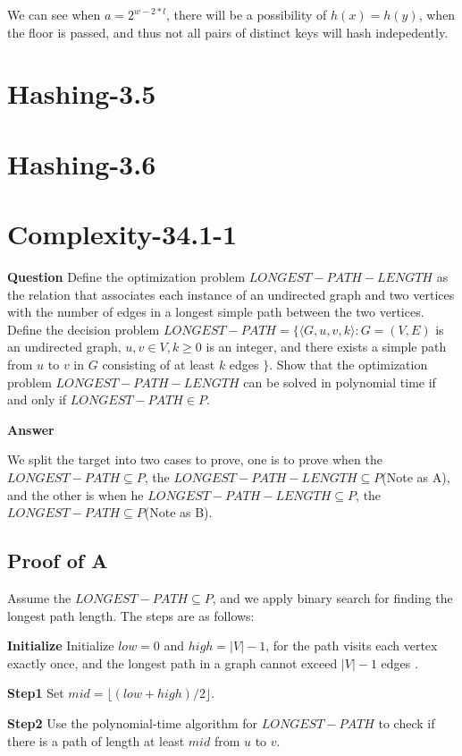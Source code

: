 \documentclass[12pt]{article}
\begin{document}
We can see when $a=2^{w-2*l}$, there will be a possibility of $h(x) = h(y)$, when the floor is passed, and thus not all pairs of distinct keys will hash indepedently.




\section{Hashing-3.5}

\section{Hashing-3.6}

\section{Complexity-34.1-1}
\textbf{Question}
Define the optimization problem $LONGEST-PATH-LENGTH$ as the relation that associates each instance of an undirected graph and two vertices with the number of edges in a longest simple path between the two vertices. Define the decision problem $LONGEST-PATH= \{\langle G, u, v, k\rangle: G = (V, E)$ is an undirected graph, $u, v \in V, k \ge 0$ is an integer, and there exists a simple path from $u$ to $v$ in $G$ consisting of at least $k$ edges $\}$. Show that the optimization problem $LONGEST-PATH-LENGTH$ can be solved in polynomial time if and only if $LONGEST-PATH \in P$.

\textbf{Answer}

We split the target into two cases to prove, one is to prove when the $LONGEST-PATH \subseteq P$, the $LONGEST-PATH-LENGTH \subseteq P$(Note as A), and the other is when he $LONGEST-PATH-LENGTH \subseteq P$, the $LONGEST-PATH \subseteq P$(Note as B).
 
\subsection{Proof of A}
Assume the $LONGEST-PATH \subseteq P$, and we apply binary search for finding the longest path length. The steps are as follows:

\textbf{Initialize} Initialize $low = 0$ and $high = |V| - 1$, for the path visits each vertex exactly once, and the longest path in a graph cannot exceed $|V| - 1$ edges . 

\textbf{Step1} Set $mid = \lfloor (low + high) / 2 \rfloor$.

\textbf{Step2} Use the polynomial-time algorithm for $LONGEST-PATH$ to check if there is a path of length at least $mid$ from $u$ to $v$.
\end{document}
